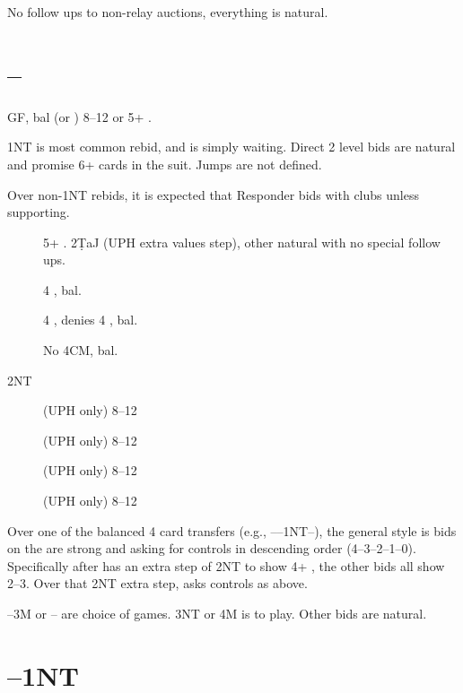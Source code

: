 \documentclass[tom-ari]{subfile}
\begin{document}
	No follow ups to non-relay auctions, everything is natural. 
	
	\section[1C--1S]{--}
	
	GF, bal (or ) 8--12 or 5+ \clubsuit.
	
	1NT is most common rebid, and is simply waiting.  Direct 2 level bids are natural and promise 6+ cards in the suit.   Jumps are not defined.
	
	Over non-1NT rebids, it is expected that Responder bids  with clubs unless supporting.
	
	\begin{boxbid}{}
		\begin{description}
		\item[] 5+ \clubsuit.  2\d TaJ (UPH extra values step), other natural with no special follow ups. 
		\item[] 4 \heartsuit, bal. 
		\item[] 4 \spadesuit, denies 4 \heartsuit, bal. 
		\item[] No 4CM, bal.  
		\item[2NT]  (UPH only) 8--12 
		\item[]  (UPH only) 8--12
		\item[]  (UPH only) 8--12
		\item[]  (UPH only) 8--12
		\end{description}
	\end{boxbid}
	
	Over one of the balanced 4 card transfers (e.g., ----1NT--), the general style is bids on the  are strong and asking for controls in descending order (4--3--2--1--0).  Specifically  after  has an extra step of 2NT to show 4+ \spadesuit, the other bids all show 2--3.  Over that 2NT extra step,  asks controls as above.
	
	--3M or -- are choice of games.  3NT or 4M is to play. Other bids are natural. 


	\section[1C--1NT]{--1NT}
	
\end{document}
